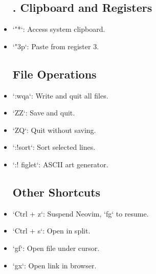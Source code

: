 \documentclass{report}
\begin{document}
\begin{itemize}
	\subsection{. Clipboard and Registers}
\item `"*`: Access system clipboard.
\item `"3p`: Paste from register 3.

	\subsection{File Operations}
\item `:wqa`: Write and quit all files.
\item `ZZ`: Save and quit.
\item `ZQ`: Quit without saving.
\item `:!sort`: Sort selected lines.
\item `:! figlet`: ASCII art generator.

	\subsection{Other Shortcuts}
\item `Ctrl + z`: Suspend Neovim, `fg` to resume.
\item `Ctrl + s`: Open in split.
\item `gf`: Open file under cursor.
\item `gx`: Open link in browser.
\end{itemize}
\end{document}
